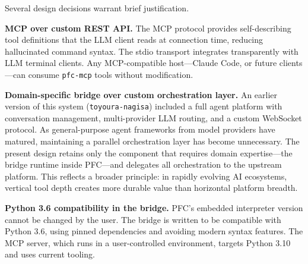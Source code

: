Several design decisions warrant brief justification.

\textbf{MCP over custom REST API.} The MCP protocol provides self-describing tool definitions that the LLM client reads at connection time, reducing hallucinated command syntax. The stdio transport integrates transparently with LLM terminal clients. Any MCP-compatible host---Claude Code, or future clients---can consume \texttt{pfc-mcp} tools without modification.

\textbf{Domain-specific bridge over custom orchestration layer.} An earlier version of this system (\texttt{toyoura-nagisa}) included a full agent platform with conversation management, multi-provider LLM routing, and a custom WebSocket protocol. As general-purpose agent frameworks from model providers have matured, maintaining a parallel orchestration layer has become unnecessary. The present design retains only the component that requires domain expertise---the bridge runtime inside PFC---and delegates all orchestration to the upstream platform. This reflects a broader principle: in rapidly evolving AI ecosystems, vertical tool depth creates more durable value than horizontal platform breadth.

\textbf{Python 3.6 compatibility in the bridge.} PFC's embedded interpreter version cannot be changed by the user. The bridge is written to be compatible with Python 3.6, using pinned dependencies and avoiding modern syntax features. The MCP server, which runs in a user-controlled environment, targets Python 3.10 and uses current tooling.
